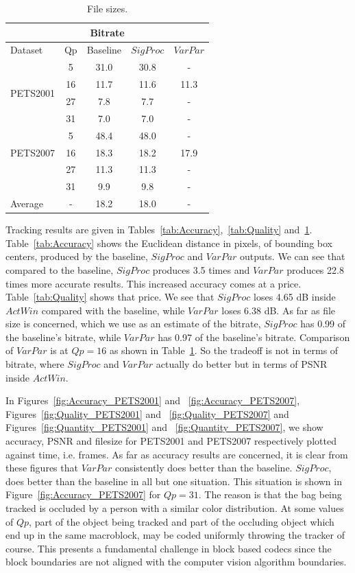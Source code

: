 \documentclass{article}
\begin{document}
\begin{table}
\centering
\begin{tabular}{|l|c|c|c|c|}
\hline
\multicolumn{5}{|c|}{Bitrate} \\
\hline
Dataset & Qp & Baseline & $SigProc$  & $VarPar$\\ 
\hline
\multirow{4}{*}{PETS2001} 
	&5 &31.0 &  30.8 &  -\\
	&16 &11.7 &  11.6 &  11.3\\
	&27 &7.8 &   7.7 &  -\\
	&31 &7.0 &   7.0 &  -\\
 \hline
 \multirow{3}{*}{PETS2007} 
	&5 &48.4 &  48.0 &  -\\
	&16 &18.3 &  18.2 &  17.9\\
	&27 &11.3 &  11.3 &  -\\
	&31 &9.9 &   9.8 &  -\\
\hline
\multirow{1}{*}{Average}
& - & 18.2 & 18.0 & - \\ 
\hline
\end{tabular}
\caption{File sizes.}
\label{tab:FileSize}
\end{table}

Tracking results are given in Tables~\ref{tab:Accuracy},~\ref{tab:Quality} and~\ref{tab:FileSize}.  Table~\ref{tab:Accuracy} shows the Euclidean distance in pixels, of bounding box centers, produced by the baseline, $SigProc$ and $VarPar$ outputs.  We can see that compared to the baseline, $SigProc$ produces 3.5 times and $VarPar$ produces 22.8 times more accurate results.  This increased accuracy comes at a price.  Table~\ref{tab:Quality} shows that price.  We see that $SigProc$ loses 4.65 dB inside $ActWin$ compared with the baseline, while $VarPar$ loses 6.38 dB.  As far as file size is concerned, which we use as an estimate of the bitrate, $SigProc$ has 0.99 of the baseline's bitrate, while $VarPar$ has 0.97 of the baseline's bitrate.  Comparison of $VarPar$ is at $Qp=16$ as shown in Table~\ref{tab:FileSize}.  So the tradeoff is not in terms of bitrate, where $SigProc$ and $VarPar$ actually do better but in terms of PSNR inside $ActWin$. 
 
In Figures~\ref{fig:Accuracy_PETS2001} and ~\ref{fig:Accuracy_PETS2007}, Figures~\ref{fig:Quality_PETS2001} and ~\ref{fig:Quality_PETS2007} and Figures~\ref{fig:Quantity_PETS2001} and ~\ref{fig:Quantity_PETS2007}, we show accuracy, PSNR and filesize for PETS2001 and PETS2007 respectively plotted against time, i.e. frames.  As far as accuracy results are concerned, it is clear from these figures that $VarPar$ consistently does better than the baseline.  $SigProc$, does better than the baseline in all but one situation.  This situation is shown in Figure~\ref{fig:Accuracy_PETS2007} for $Qp=31$.  The reason is that the bag being tracked is occluded by a person with a similar color distribution.  At some values of $Qp$, part of the object being tracked and part of the occluding object which end up in the same macroblock, may be coded uniformly throwing the tracker of course.  This presents a fundamental challenge in block based codecs since the block boundaries are not aligned with the computer vision algorithm boundaries.
\end{document}
